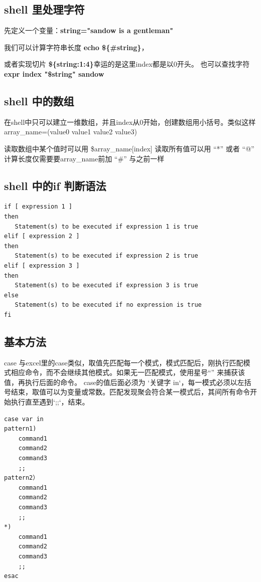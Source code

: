 \subsection{shell 里处理字符}

先定义一个变量：\textbf{string="sandow is a gentleman"}

我们可以计算字符串长度 \textbf{echo \$\{\#string\}}，

或者实现切片 \textbf{\$\{string:1:4\}}幸运的是这里index都是以0开头。
也可以查找字符 \textbf{expr index "\$string" sandow}

\subsection{shell 中的数组}

在shell中只可以建立一维数组，并且index从0开始，创建数组用小括号。类似这样array_name=(value0 value1 value2 value3)

读取数组中某个值时可以用  \${array_name[index]} 读取所有值可以用 “*” 或者 “@” 计算长度仅需要要array_name前加 “\#” 与之前一样

\subsection{shell 中的if 判断语法}

\begin{lstlisting}
if [ expression 1 ]
then
   Statement(s) to be executed if expression 1 is true
elif [ expression 2 ]
then
   Statement(s) to be executed if expression 2 is true
elif [ expression 3 ]
then
   Statement(s) to be executed if expression 3 is true
else
   Statement(s) to be executed if no expression is true
fi
\end{lstlisting}

\subsection{基本方法} 
case 与excel里的case类似，取值先匹配每一个模式，模式匹配后，刚执行匹配模式相应命令，而不会继续其他模式。如果无一匹配模式，使用星号“\*”
来捕获该值，再执行后面的命令。 case的值后面必须为 `关键字 in`，每一模式必须以左括号结束，取值可以为变量或常数。匹配发现聚会符合某一模式后，其间所有命令开始执行直至遇到`;;`，结束。

\begin{lstlisting}
case var in
pattern1)
    command1
    command2
    command3
    ;;
pattern2）
    command1
    command2
    command3
    ;;
*)
    command1
    command2
    command3
    ;;
esac
\end{lstlisting}

